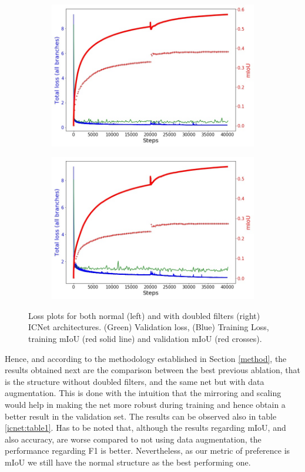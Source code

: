 \begin{figure}
\centering
\begin{subfigure}{.5\textwidth}
  \centering
  \includegraphics[width=.95\linewidth]{icnet_res_1.jpg}
\end{subfigure}%
\begin{subfigure}{.5\textwidth}
  \centering
  \includegraphics[width=.95\linewidth]{icnet_res_2.jpg}
\end{subfigure}
\caption{Loss plots for both normal (left) and with doubled filters (right) ICNet architectures. (Green) Validation loss, (Blue) Training Loss,  training mIoU (red solid line) and validation mIoU (red crosses). }
\label{icnet:filters}
\end{figure}

Hence, and according to the methodology established in Section \ref{method}, the results obtained next are the comparison between the best previous ablation, that is the structure without doubled filters, and the same net but with data augmentation. This is done with the intuition that the mirroring and scaling would help in making the net more robust during training and hence obtain a better result in the validation set. The results can be observed also in table \ref{icnet:table1}. Has to be noted that, although the results regarding mIoU, and also accuracy, are worse compared to not using data augmentation, the performance regarding F1 is better. Nevertheless, as our metric of preference is mIoU we still have the normal structure as the best performing one.\newline

